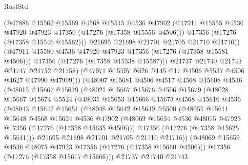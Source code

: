 \begin{lexlean}{RustStd}
\begin{coremodule}
                      (@47886
                        @15562
                        @15569
                        @4568
                        @15545
                        @4536
                        @47902
                        (@47911 @15555 @4536 @47920 @47923 @17356 (@17276 (@17358 @15556 @4506)))
                        @17356
                        (@17276 (@17358 @15546 @15562)))
                      @21695
                      @21698
                      @21701
                      @21705
                      @21710
                      @21716))
                  (@47911 @15580 @4536 @47920 @47923 @17356 (@17276 (@17358 @15581 @4506)))
                  @17356
                  (@17276 (@17358 @15538 @15587)))
                @21737
                @21740
                @21743
                @21747
                @21752
                @21758)
              (@47971 @15597 @526 @145 @17 @4506 @5537 @4506 @4627 @47990 @47999)))
          (@48007
            @15681
            @4506
            @4517
            @4568
            @15608
            @4536
            (@48015
              @15667
              @15679
              (@48021
                @15667
                @15676
                @4506
                @15679
                (@48028
                  @15667
                  @15674
                  @5524
                  (@48035
                    @15653
                    @15666
                    @15673
                    @4568
                    @15616
                    @4536
                    (@48043
                      @15642
                      @15651
                      (@48048
                        @15642
                        @15649
                        @5500
                        (@48055
                          @15641
                          @15648
                          @4568
                          @15624
                          @4536
                          @47902
                          (@48069 @15634 @4536 @48075 @47923 @17356 (@17276 (@17358 @15635 @4506)))
                          @17356
                          (@17276 (@17358 @15625 @15641)))
                        @21695
                        @21698
                        @21701
                        @21705
                        @21710
                        @21716))
                    (@48069 @15659 @4536 @48075 @47923 @17356 (@17276 (@17358 @15660 @4506)))
                    @17356
                    (@17276 (@17358 @15617 @15666)))
                  @21737
                  @21740
                  @21743

\end{coremodule}
\end{lexlean}

